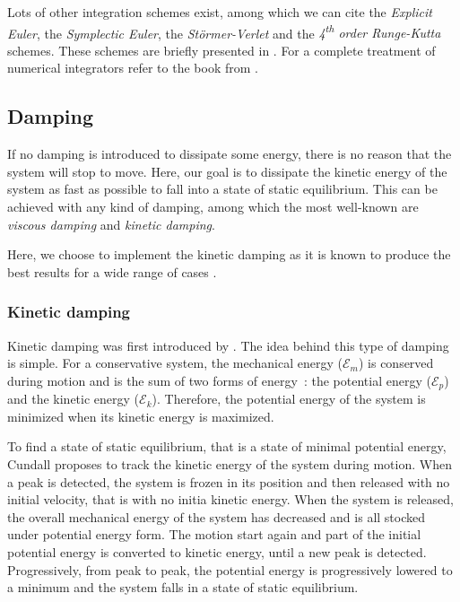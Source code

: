 Lots of other integration schemes exist, among which we can cite the \emph{Explicit Euler}, the \emph{Symplectic Euler}, the \emph{Störmer-Verlet} and the \emph{4\textsuperscript{th} order Runge-Kutta} schemes. These schemes are briefly presented in \cite{Fierz2013}. For a complete treatment of numerical integrators refer to the book from .

\subsection{Damping}\label{sec:damping}
If no damping is introduced to dissipate some energy, there is no reason that the system will stop to move. Here, our goal is to dissipate the kinetic energy of the system as fast as possible to fall into a state of static equilibrium. This can be achieved with any kind of damping, among which the most well-known are \emph{viscous damping} and \emph{kinetic damping}. 

Here, we choose to implement the kinetic damping as it is known to produce the best results for a wide range of cases \cite{Rezaiee2012}.

\subsubsection{Kinetic damping}
Kinetic damping was first introduced by . The idea behind this type of damping is simple. For a conservative system, the mechanical energy ($\mathcal{E}_m$) is conserved during motion and is the sum of two forms of energy~: the potential energy ($\mathcal{E}_p$) and the kinetic energy ($\mathcal{E}_k$). Therefore, the potential energy of the system is minimized when its kinetic energy is maximized.

To find a state of static equilibrium, that is a state of minimal potential energy, Cundall proposes to track the kinetic energy of the system during motion. When a peak is detected, the system is frozen in its position and then released with no initial velocity, that is with no initia kinetic energy. When the system is released, the overall mechanical energy of the system has decreased and is all stocked under potential energy form. The motion start again and part of the initial potential energy is converted to kinetic energy, until a new peak is detected. Progressively, from peak to peak, the potential energy is progressively lowered to a minimum and the system falls in a state of static equilibrium.


